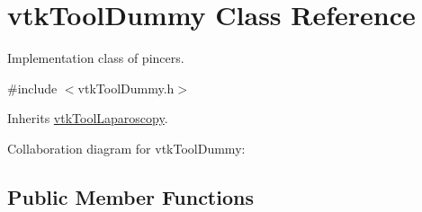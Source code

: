 \hypertarget{classvtkToolDummy}{
\section{vtkToolDummy Class Reference}
\label{classvtkToolDummy}
}


Implementation class of pincers.  




{\ttfamily \#include $<$vtkToolDummy.h$>$}



Inherits \hyperlink{classvtkToolLaparoscopy}{vtkToolLaparoscopy}.



Collaboration diagram for vtkToolDummy:\subsection*{Public Member Functions}
